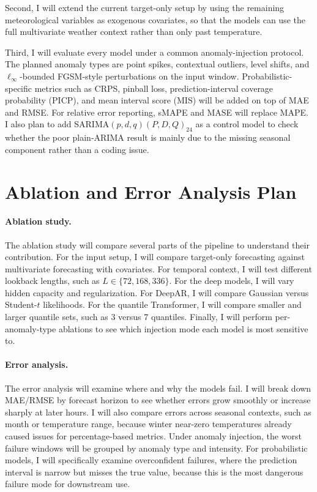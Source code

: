 \documentclass[11pt,a4paper]{article}
\begin{document}
Second, I will extend the current target-only setup by using the
remaining meteorological variables as exogenous covariates, so that the models
can use the full multivariate weather context rather than only past
temperature.

Third, I will evaluate every model under a common anomaly-injection protocol.
The planned anomaly types are point spikes, contextual outliers, level shifts,
and $\ell_{\infty}$-bounded FGSM-style perturbations on the input window.
Probabilistic-specific metrics such as CRPS, pinball loss, prediction-interval
coverage probability (PICP), and mean interval score (MIS) will be added on top
of MAE and RMSE. For relative error reporting, sMAPE and MASE will replace
MAPE. I also plan to add SARIMA$(p,d,q)(P,D,Q)_{24}$ as a control model to
check whether the poor plain-ARIMA result is mainly due to the missing seasonal
component rather than a coding issue.

\section{Ablation and Error Analysis Plan}

\paragraph{Ablation study.}
The ablation study will compare several parts of the pipeline to understand
their contribution. For the input setup, I will compare target-only forecasting
against multivariate forecasting with covariates. For temporal context, I will
test different lookback lengths, such as $L \in \{72, 168, 336\}$. For the
deep models, I will vary hidden capacity and regularization. For DeepAR, I will
compare Gaussian versus Student-$t$ likelihoods. For the quantile Transformer,
I will compare smaller and larger quantile sets, such as 3 versus 7 quantiles.
Finally, I will perform per-anomaly-type ablations to see which injection mode
each model is most sensitive to.

\paragraph{Error analysis.}
The error analysis will examine where and why the models fail. I will break
down MAE/RMSE by forecast horizon to see whether errors grow smoothly or
increase sharply at later hours. I will also compare errors across seasonal
contexts, such as month or temperature range, because winter near-zero
temperatures already caused issues for percentage-based metrics. Under anomaly
injection, the worst failure windows will be grouped by anomaly type and
intensity. For probabilistic models, I will specifically examine
overconfident failures, where the prediction interval is narrow but misses the
true value, because this is the most dangerous failure mode for downstream use.
\end{document}
